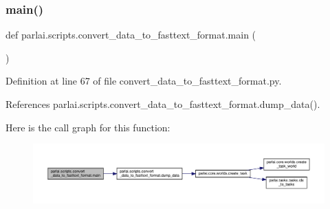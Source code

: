 \subsubsection{\texorpdfstring{main()}{main()}}
{\footnotesize\ttfamily def parlai.\+scripts.\+convert\+\_\+data\+\_\+to\+\_\+fasttext\+\_\+format.\+main (\begin{DoxyParamCaption}{ }\end{DoxyParamCaption})}



Definition at line 67 of file convert\+\_\+data\+\_\+to\+\_\+fasttext\+\_\+format.\+py.



References parlai.\+scripts.\+convert\+\_\+data\+\_\+to\+\_\+fasttext\+\_\+format.\+dump\+\_\+data().

Here is the call graph for this function\+:
\nopagebreak
\begin{figure}[H]
\begin{center}
\leavevmode
\includegraphics[width=350pt]{namespaceparlai_1_1scripts_1_1convert__data__to__fasttext__format_adef5d250b1de0b6c868a9eb4e699a81f_cgraph}
\end{center}
\end{figure}
